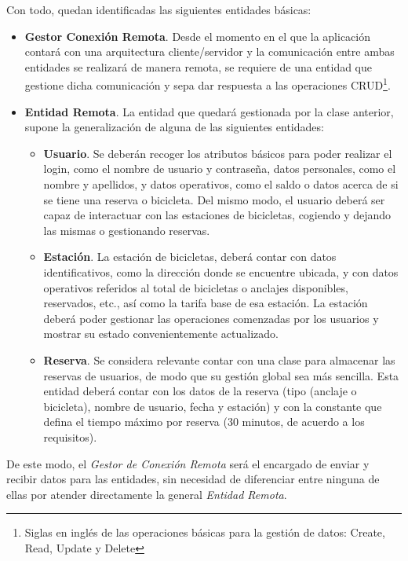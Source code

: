 Con todo, quedan identificadas las siguientes entidades básicas:

\begin{itemize}
	\item \textbf{Gestor Conexión Remota}. Desde el momento en el que la aplicación contará con una arquitectura cliente/servidor y la comunicación entre ambas entidades se realizará de manera remota, se requiere de una entidad que gestione dicha comunicación y sepa dar respuesta a las operaciones CRUD\footnote{Siglas en inglés de las operaciones básicas para la gestión de datos: Create, Read, Update y Delete}.
	\item \textbf{Entidad Remota}. La entidad que quedará gestionada por la clase anterior, supone la generalización de alguna de las siguientes entidades:
	\begin{itemize}
		\item \textbf{Usuario}. Se deberán recoger los atributos básicos para poder realizar el login, como el nombre de usuario y contraseña, datos personales, como el nombre y apellidos, y datos operativos, como el saldo o datos acerca de si se tiene una reserva o bicicleta. Del mismo modo, el usuario deberá ser capaz de interactuar con las estaciones de bicicletas, cogiendo y dejando las mismas o gestionando reservas.
		\item \textbf{Estación}. La estación de bicicletas, deberá contar con datos identificativos, como la dirección donde se encuentre ubicada, y con datos operativos referidos al total de bicicletas o anclajes disponibles, reservados, etc., así como la tarifa base de esa estación. La estación deberá poder gestionar las operaciones comenzadas por los usuarios y mostrar su estado convenientemente actualizado.
		\item \textbf{Reserva}. Se considera relevante contar con una clase para almacenar las reservas de usuarios, de modo que su gestión global sea más sencilla. Esta entidad deberá contar con los datos de la reserva (tipo (anclaje o bicicleta), nombre de usuario, fecha y estación) y con la constante que defina el tiempo máximo por reserva (30 minutos, de acuerdo a los requisitos).
	\end{itemize}
\end{itemize}

De este modo, el \emph{Gestor de Conexión Remota} será el encargado de enviar y recibir datos para las entidades, sin necesidad de diferenciar entre ninguna de ellas por atender directamente la general \emph{Entidad Remota}.

